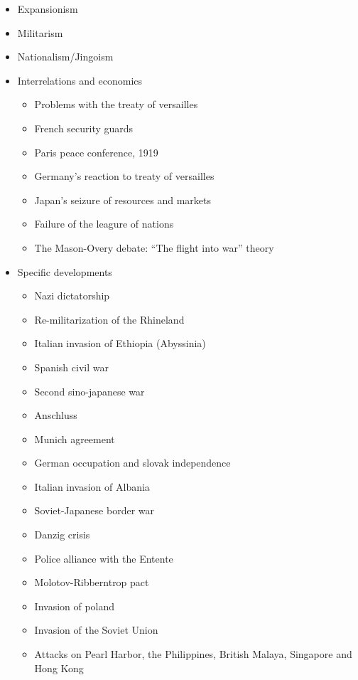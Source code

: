 \documentclass[
  openany]{book}
\providecommand{\tightlist}{%
  \setlength{\itemsep}{0pt}\setlength{\parskip}{0pt}}
\begin{document}
\begin{itemize}
\tightlist
\item
  Expansionism
\item
  Militarism
\item
  Nationalism/Jingoism
\item
  Interrelations and economics

  \begin{itemize}
  \tightlist
  \item
    Problems with the treaty of versailles
  \item
    French security guards
  \item
    Paris peace conference, 1919
  \item
    Germany's reaction to treaty of versailles
  \item
    Japan's seizure of resources and markets
  \item
    Failure of the leagure of nations
  \item
    The Mason-Overy debate: ``The flight into war'' theory
  \end{itemize}
\item
  Specific developments

  \begin{itemize}
  \tightlist
  \item
    Nazi dictatorship
  \item
    Re-militarization of the Rhineland
  \item
    Italian invasion of Ethiopia (Abyssinia)
  \item
    Spanish civil war
  \item
    Second sino-japanese war
  \item
    Anschluss
  \item
    Munich agreement
  \item
    German occupation and slovak independence
  \item
    Italian invasion of Albania
  \item
    Soviet-Japanese border war
  \item
    Danzig crisis
  \item
    Police alliance with the Entente
  \item
    Molotov-Ribberntrop pact
  \item
    Invasion of poland
  \item
    Invasion of the Soviet Union
  \item
    Attacks on Pearl Harbor, the Philippines, British Malaya, Singapore and Hong Kong
  \end{itemize}
\end{itemize}
\end{document}
